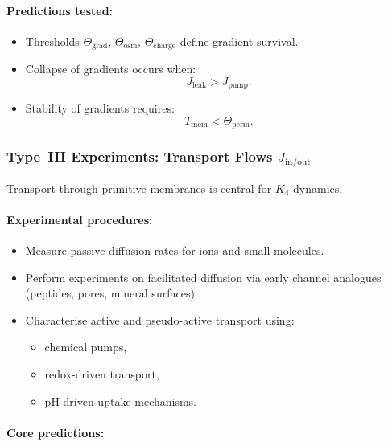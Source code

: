 \paragraph{Predictions tested:}

\begin{itemize}
    \item Thresholds $\Theta_{\mathrm{grad}}$, $\Theta_{\mathrm{osm}}$, 
          $\Theta_{\mathrm{charge}}$ define gradient survival.
    \item Collapse of gradients occurs when:
          \[
             J_{\mathrm{leak}} > J_{\mathrm{pump}}.
          \]
    \item Stability of gradients requires:
          \[
             T_{\mathrm{mem}} < \Theta_{\mathrm{perm}}.
          \]
\end{itemize}



\subsubsection{Type~III Experiments: Transport Flows $J_{\mathrm{in/out}}$}

Transport through primitive membranes is central for $K_4$ dynamics.

\paragraph{Experimental procedures:}

\begin{itemize}
    \item Measure passive diffusion rates for ions and small molecules.
    \item Perform experiments on facilitated diffusion via early channel 
          analogues (peptides, pores, mineral surfaces).
    \item Characterise active and pseudo-active transport using:
          \begin{itemize}
              \item chemical pumps,
              \item redox-driven transport,
              \item pH-driven uptake mechanisms.
          \end{itemize}
\end{itemize}

\paragraph{Core predictions:}

